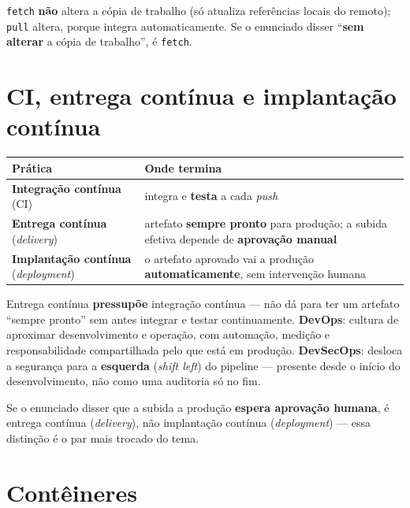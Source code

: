 \begin{cuidado}
\texttt{fetch} \textbf{não} altera a cópia de trabalho (só atualiza
referências locais do remoto); \texttt{pull} altera, porque integra
automaticamente. Se o enunciado disser “\textbf{sem alterar} a cópia de
trabalho”, é \texttt{fetch}.
\end{cuidado}

\section{CI, entrega contínua e implantação contínua}

\begin{conceito}
\begin{center}
\begin{tabular}{@{}p{4.4cm}p{6.8cm}@{}}
\toprule
\textbf{Prática} & \textbf{Onde termina} \\
\midrule
\textbf{Integração contínua} (CI) & integra e \textbf{testa} a cada
\textit{push} \\
\textbf{Entrega contínua} (\textit{delivery}) & artefato \textbf{sempre
pronto} para produção; a subida efetiva depende de \textbf{aprovação
manual} \\
\textbf{Implantação contínua} (\textit{deployment}) & o artefato aprovado
vai a produção \textbf{automaticamente}, sem intervenção humana \\
\bottomrule
\end{tabular}
\end{center}

Entrega contínua \textbf{pressupõe} integração contínua --- não dá para
ter um artefato “sempre pronto” sem antes integrar e testar
continuamente. \textbf{DevOps}: cultura de aproximar desenvolvimento e
operação, com automação, medição e responsabilidade compartilhada pelo
que está em produção. \textbf{DevSecOps}: desloca a segurança para a
\textbf{esquerda} (\textit{shift left}) do pipeline --- presente desde o
início do desenvolvimento, não como uma auditoria só no fim.
\end{conceito}

\begin{cuidado}
Se o enunciado disser que a subida a produção \textbf{espera aprovação
humana}, é entrega contínua (\textit{delivery}), não implantação contínua
(\textit{deployment}) --- essa distinção é o par mais trocado do tema.
\end{cuidado}

\section{Contêineres}

